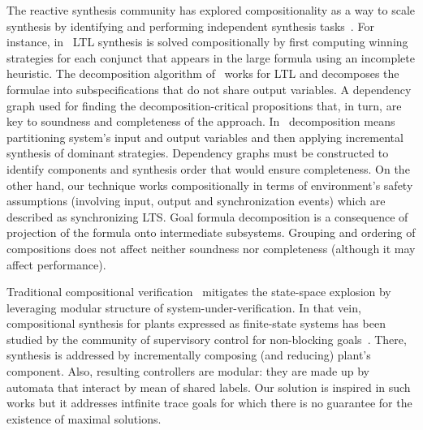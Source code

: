 The reactive synthesis community has explored compositionality as a way to scale synthesis by identifying and performing independent synthesis tasks~\cite{DBLP:conf/atva/FiliotJR10,DBLP:journals/isse/FinkbeinerGP23,DBLP:conf/atva/FinkbeinerP20}. 
For instance, in~\cite{DBLP:conf/atva/FiliotJR10} LTL synthesis is solved compositionally by first computing winning strategies for each conjunct that appears in the large formula using an incomplete heuristic. The decomposition algorithm of~\cite{DBLP:journals/isse/FinkbeinerGP23} works for LTL and decomposes the formulae into  subspecifications that do not share output variables. A dependency graph used for finding the decomposition-critical propositions that, in turn, are key to soundness and completeness of the approach. 
In~\cite{DBLP:conf/atva/FinkbeinerP20}  decomposition means partitioning system's input and output variables and then applying incremental synthesis of dominant strategies. Dependency graphs must be constructed to identify components and synthesis order that would ensure completeness. On the other hand, our technique works compositionally in terms of environment's safety assumptions (involving input, output and synchronization events) which are described as synchronizing LTS. Goal formula decomposition is a consequence of projection of the formula onto intermediate subsystems. Grouping and ordering of compositions does not affect neither soundness nor completeness (although it may affect performance).



Traditional compositional verification~\cite{DBLP:conf/cav/GrafS90,DBLP:conf/popl/ClarkeGL92} mitigates the state-space explosion by leveraging modular structure of system-under-verification. In that vein, compositional synthesis for plants expressed as finite-state systems has been studied by the community of supervisory control for non-blocking goals~\cite{DBLP:journals/deds/FlordalMFA07,DBLP:journals/deds/MalikMF23}. There, synthesis is  addressed by incrementally composing (and reducing) plant's component. Also, resulting controllers are modular: they are  made up by automata that interact by mean of shared labels.  Our solution is inspired in such works but it addresses  intfinite trace goals for which there is no guarantee for the existence of maximal solutions.

